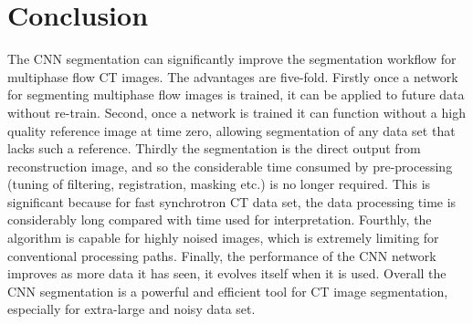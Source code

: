 \section{Conclusion}
The CNN segmentation can significantly improve the segmentation workflow for multiphase flow \textmu CT images. The advantages are five-fold. Firstly once a network for segmenting multiphase flow images is trained, it can be applied to future data without re-train. Second, once a network is trained it can function without a high quality reference image at time zero, allowing segmentation of any data set that lacks such a reference. Thirdly the segmentation is the direct output from reconstruction image, and so the considerable time consumed by pre-processing (tuning of filtering, registration, masking etc.) is no longer required. This is significant because for fast synchrotron \textmu CT data set, the data processing time is considerably long compared with time used for interpretation. Fourthly, the algorithm is capable for highly noised images, which is extremely limiting for conventional processing paths. Finally, the performance of the CNN network improves as more data it has seen, it evolves itself when it is used. Overall the CNN segmentation is a powerful and efficient tool for \textmu CT image segmentation, especially for extra-large and noisy data set.

